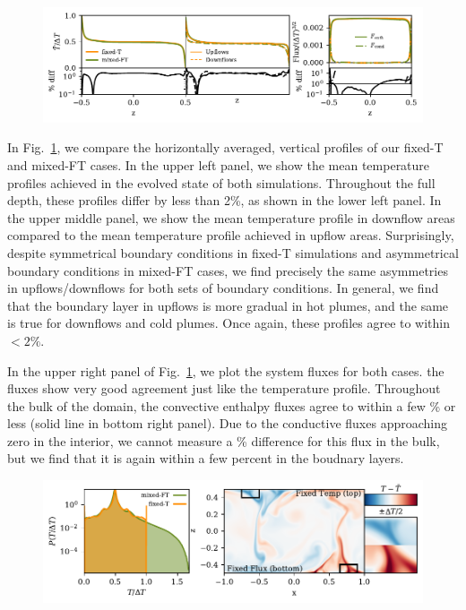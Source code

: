 \documentclass[aps, pre, onecolumn, nofootinbib, notitlepage, groupedaddress, amsfonts, amssymb, amsmath, longbibliography]{revtex4-1}
\begin{document}
\begin{figure}
\includegraphics[width=\textwidth]{./figs/rbc_1D_profiles.pdf}
\caption{ 
\label{fig:rbc_1D_profiles} }
\end{figure}

In Fig.~\ref{fig:rbc_1D_profiles}, we compare the horizontally averaged, vertical profiles of our fixed-T and mixed-FT cases.
In the upper left panel, we show the mean temperature profiles achieved in the evolved state of both simulations.
Throughout the full depth, these profiles differ by less than 2\%, as shown in the lower left panel.
In the upper middle panel, we show the mean temperature profile in downflow areas compared to the mean temperature profile achieved in upflow areas.
Surprisingly, despite symmetrical boundary conditions in fixed-T simulations and asymmetrical boundary conditions in mixed-FT cases, we find precisely the same asymmetries in upflows/downflows for both sets of boundary conditions.
In general, we find that the boundary layer in upflows is more gradual in hot plumes, and the same is true for downflows and cold plumes.
Once again, these profiles agree to within $< 2\%$.

In the upper right panel of Fig.~\ref{fig:rbc_1D_profiles}, we plot the system fluxes for both cases.
the fluxes show very good agreement just like the temperature profile.
Throughout the bulk of the domain, the convective enthalpy fluxes agree to within a few \% or less (solid line in bottom right panel).
Due to the conductive fluxes approaching zero in the interior, we cannot measure a \% difference for this flux in the bulk, but we find that it is again within a few percent in the boudnary layers.

\begin{figure}
\includegraphics[width=\textwidth]{./figs/rbc_dynamics_asymmetries.pdf}
\caption{ 
\label{fig:rbc_dynamics_asymmetries} }
\end{figure}
\end{document}
